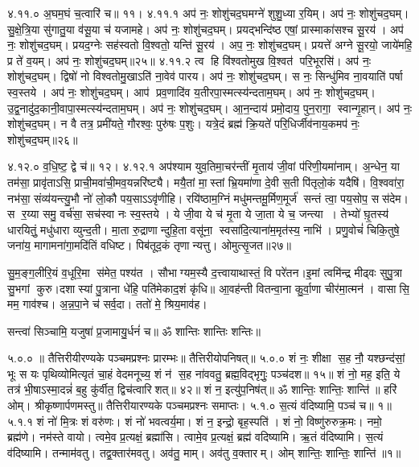 ४.११.०
अ॒घम॒घं च॒त्वारि॑ च॥ ११।
४.११.१
अप॑ नः॒ शोशु॑चद॒घमग्ने॑ शुशु॒ध्या र॒यिम्। अप॑ नः॒ शोशु॑चद॒घम्। सु॒क्षे॒त्रि॒या सु॑गातु॒या व॑सू॒या च॑ यजामहे। अप॑ नः॒ शोशु॑चद॒घम्। प्रयद्भन्दि॑ष्ठ एषां॒ प्रास्माका॑सश्च सू॒रय॑। अप॑ नः॒ शोशु॑चद॒घम्। प्रयद॒ग्नेः सह॑स्वतो वि॒श्वतो॒ यन्ति॑ सू॒रय॑। अप॒ नः॒ शोशु॑चद॒घम्। प्रयत्ते॑ अग्ने सू॒रयो॒ जाये॑महि॒ प्र ते॑ व॒यम्। अप॑ नः॒ शोशु॑चद॒घम्॥२५॥
४.११.२
त्व हि वि॑श्वतोमुख वि॒श्वत॑ परि॒भूरसि॑। अप॑ नः॒ शोशु॑चद॒घम्। द्विषो॑ नो विश्वतोमु॒खाऽति॑ ना॒वेव॑ पारय। अप॑ नः॒ शोशु॑चद॒घम्। स नः॒ सिन्धु॑मिव ना॒वयाति॑ पर्\mbox{}षा स्व॒स्तये। अप॑ नः॒ शोशु॑चद॒घम्। आप॑ प्रव॒णादि॑व य॒तीरपा॒स्मत्स्य॑न्दताम॒घम्। अप॑ नः॒ शोशु॑चद॒घम्। उ॒द्व॒नादु॑द॒कानी॒वापा॒स्मत्स्य॑न्दताम॒घम्। अप॑ नः॒ शोशु॑चद॒घम्। आ॒न॒न्दाय॑ प्रमो॒दाय॒ पुन॒रागा॒ स्वान्गृ॒हान्। अप॑ नः॒ शोशु॑चद॒घम्। न वै तत्र॒ प्रमी॑यते॒ गौरश्वः॒ पुरु॑षः प॒शुः। यत्रे॒दं ब्रह्म॑ क्रि॒यते॑ परि॒धिर्जीव॑नाय॒कमप॑ नः॒ शोशु॑चद॒घम्॥२६॥
\anuvakamend

४.१२.०
व॒धि॒ष्ट॒ द्वे च॑॥ १२।
४.१२.१
अप॑श्याम युव॒तिमा॒चर॑न्तीं मृ॒ताय॑ जी॒वां प॑रिणी॒यमा॑नाम्। अ॒न्धेन॒ या तम॑सा॒ प्रावृ॑ताऽसि॒ प्राची॒मवा॑ची॒मव॒यन्नरि॑ष्ट्यै। मयै॒तां मा॒स्तां भ्रि॒यमा॑णा दे॒वी स॒ती पि॑तृलो॒कं यदैषि॑। वि॒श्ववा॑रा॒ नभ॑सा॒ संव्य॑यन्त्यु॒भौ नो॑ लो॒कौ पय॒साऽऽवृ॑णीहि। रयि॑ष्ठाम॒ग्निं मधु॑मन्तमू॒र्मिण॒मूर्ज॑ सन्तं त्वा॒ पय॒सोप॒ सस॑देम। स र॒य्या समु॒ वर्च॑सा॒ सच॑स्वा नः स्व॒स्तये। ये जी॒वा ये च॑ मृ॒ता ये जा॒ता ये च॒ जन्त्या। तेभ्यो॑ घ़ृ॒तस्य॑ धारयितुं॒ मधु॑धारा व्युन्द॒ती। मा॒ता रु॒द्राणान्दुहि॒ता वसू॑ना॒ स्वसा॑दि॒त्याना॑म॒मृत॑स्य॒ नाभि॑। प्रणु॒वोचं॑ चिकि॒तुषे॒ जना॑य॒ मागामना॑गा॒मदि॑तिं वधिष्ट। पिब॑तूद॒कं तृणान्यत्तु। ओमुत्सृ॒जत॥२७॥

सु॒म॒ङ्ग॒लीरि॒यं व॒धूरि॒मा स॑मेत॒ पश्य॑त । सौभाग्यम॒स्यै द॒त्त्वायाथास्तं॒ वि परे॑तन।इ॒मां त्वमि॑न्द्र मीढ्वः सुपु॒त्रा सु॒भगां कुरु।दशास्यां पु॒त्राना धे॑हि॒ पति॑मेकाद॒शं कृ॑धि॥ आ॒वह॑न्ती वितन्वा॒ना कु॒र्वा॒णा चीर॑मा॒त्मन॑। वासासि॒ मम॒ गाव॑श्च। अ॒न्न॒पा॒ने च॑ सर्व॒दा। ततो॑ मे॒ श्रिय॒माव॑ह।

सन्त्वा॑ सिञ्चामि॒ यजुषा॑ प्र॒जामायु॒र्धनं॑ च॥ ॐ शान्तिः  शान्तिः  शन्तिः॥

\closesection
\clearpage

\setcounter{anuvakam}{0}
५.०.०
॥ तैत्तिरीयीरण्यके पञ्चमप्रश्नः प्रारम्भः॥ तैत्तिरीयोपनिषत्॥
५.०.०
शं नः॒ शीक्षा स॒ह नौ॒ यश्छन्द॑सां॒ भूः स यः पृथिव्योमित्यृतं चा॒हं वेदमनूच्य॒ शं न॑ स॒ह ना॑ववतु॒ ब्रह्म॒विद्भृगुः॒ पञ्च॑दश॥ १५॥ शं नो॒ मह॒ इति॒ ये तत्र॑ भी॒षाऽस्मा॒दन्नं॑ ब॒हु कु॑र्वीत॒ द्विच॑त्वारिशत्॥ ४२॥ शं न॒ इत्यु॑प॒निष॑त्॥ ॐ शान्तिः॒ शान्तिः॒ शान्ति॑॥ हरि॑ ओम्। श्रीकृष्णार्पणमस्तु॥ तैत्तिरीयारण्यके पञ्चमप्रश्नः समाप्तः।
५.१.०
स॒त्यं व॑दिष्यामि॒ पञ्च॑ च॥ १॥
५.१.१
शं नो॑ मि॒त्रः  शं वरु॑णः। शं नो॑ भवत्वर्य॒मा। शं न॒ इन्द्रो॒ बृह॒स्पति॑। शं नो॒ विष्णु॑रुरुक्र॒मः। नमो॒ ब्रह्म॑णे। नम॑स्ते वायो। त्वमे॒व प्र॒त्यक्षं॒ ब्रह्मा॑सि। त्वामे॒व प्र॒त्यक्षं॒ ब्रह्म॑ वदिष्यामि। ऋ॒तं व॑दिष्यामि। स॒त्यं व॑दिष्यामि। तन्माम॑वतु। तद्व॒क्तार॑मवतु। अव॑तु॒ माम्। अव॑तु व॒क्तारम्। ओम् शान्तिः॒ शान्तिः॒ शान्ति॑॥१॥
\anuvakamend

